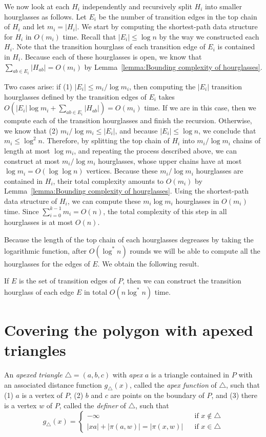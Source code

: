 \documentclass[a4paper,UKenglish]{lipics}
\newcommand{\g}[2]{\ensuremath{|\pi(#1, #2)|}}
\begin{document}
We now look at each $H_i$ independently and recursively split $H_i$ into smaller hourglasses as follows.
Let $E_i$ be the number of transition edges in the top chain of $H_i$ and let $m_i = |H_i|$. 
We start by computing the shortest-path data structure for $H_i$ in $O(m_i)$ time.
Recall that $|E_i| \leq \log n$ by the way we constructed each $H_i$.
Note that the transition hourglass of each transition edge of $E_i$ is contained in $H_i$. 
Because each of these hourglasses is open, we know that $\sum_{ab\in E_i} |H_{ab}| = O(m_i)$ by Lemma~\ref{lemma:Bounding complexity of hourglasses}. 

Two cases arise: if (1) $|E_i| \leq m_i / \log m_i$, then computing the $|E_i|$ transition hourglasses defined by the transition edges of $E_i$ takes $O(|E_i| \log m_i + \sum_{ab\in E_i} |H_{ab}|) = O(m_i)$ time. 
If we are in this case, then we compute each of the transition hourglasses and finish the recursion.
Otherwise, we know that (2) $m_i / \log m_i\leq |E_i|$, and because $|E_i| \leq \log n$, we conclude that $m_i \leq \log^2 n$.
Therefore, by splitting the top chain of $H_i$ into $m_i/\log m_i$ chains of length at most $\log m_i$, and repeating the process described above, we can construct at most $m_i / \log m_i$ hourglasses, whose upper chains have at most $\log m_i = O(\log \log n)$ vertices. 
Because these $m_i / \log m_i$ hourglasses are contained in $H_i$, their total complexity amounts to $O(m_i)$ by Lemma~\ref{lemma:Bounding complexity of hourglasses}.
Using the shortest-path data structure of $H_i$, we can compute these $m_i\log m_i$ hourglasses in $O(m_i)$ time.
Since $\sum_{i = 0} ^{k-1} m_i = O(n)$, the total complexity of this step in all hourglasses is at most $O(n)$.

Because the length of the top chain of each hourglasses degreases by taking the logarithmic function, after $O(\log^*n)$ rounds we will be able to compute all the hourglasses for the edges of $E$. We obtain the following result.

\begin{lemma}\label{lemma: Hourglass partition}
If $E$ is the set of transition edges of $P$, then we can construct the transition hourglass of each edge $E$ in total $O(n \log^* n)$ time.
\end{lemma}

\section{Covering the polygon with apexed triangles}
An \emph{apexed triangle} $\triangle = (a,b,c)$ with \emph{apex} $a$ is a triangle contained in $P$ with an associated distance function $g_\triangle(x)$, called the \emph{apex function} of $\triangle$, such that (1) $a$ is a vertex of $P$, (2) $b$ and $c$ are points on the boundary of $P$, and (3) there is a  vertex $w$ of  $P$, called the \emph{definer} of $\triangle$, such that
$$g_\triangle(x) = \left\{ \begin{array}{lll}
-\infty&&\text{if $x\notin \triangle$}\\
|xa| + \g{a}{w} = \g{x}{w} && \text{if $x\in \triangle$}
\end{array}\right.$$
\end{document}
